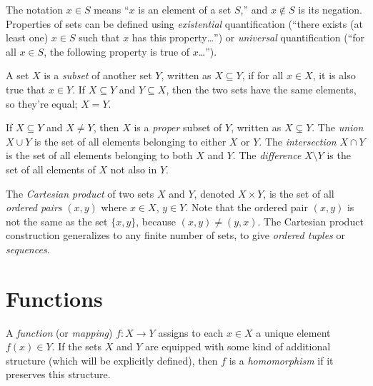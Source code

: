 \documentclass[../generics]{subfiles}
\begin{document}
The notation \index{$\in$}$x\in S$ means ``$x$ is an element of a set $S$,'' and \index{$\notin$}$x\notin S$ is its negation. Properties of sets can be defined using \emph{existential} quantification (``there exists (at least one) $x\in S$ such that $x$ has this property\ldots'') or \emph{universal} quantification (``for all $x\in S$, the following property is true of $x$\ldots'').

%
%
A set $X$ is a \emph{subset} of another set $Y$, written as \index{$\subseteq$}$X\subseteq Y$, if for all $x\in X$, it is also true that $x\in Y$. If $X\subseteq Y$ and $Y\subseteq X$, then the two sets have the same elements, so they're equal; $X=Y$.

If $X\subseteq Y$ and $X\neq Y$, then $X$ is a \emph{proper} subset of $Y$, written as \index{$\subsetneq$}$X\subsetneq Y$. The \emph{union} \index{$\cup$}$X\cup Y$ is the set of all elements belonging to either $X$ or $Y$. The \emph{intersection} \index{$\cap$}$X\cap Y$ is the set of all elements belonging to both $X$ and $Y$. The \emph{difference} \index{$\setminus$}$X\setminus Y$ is the set of all elements of $X$ not also in $Y$.

The \emph{Cartesian product} of two sets $X$ and $Y$, denoted \index{$\times$}$X\times Y$, is the set of all \emph{ordered pairs} $(x,y)$ where $x\in X$, $y\in Y$. Note that the ordered pair $(x,y)$ is not the same as the set $\{x,y\}$, because $(x,y)\neq(y,x)$. The Cartesian product construction generalizes to any finite number of sets, to give \emph{ordered tuples} or \emph{sequences}.

\section*{Functions}

A \emph{function} (or \emph{mapping}) $f\colon X\rightarrow Y$ assigns to each $x\in X$ a unique element $f(x)\in Y$. If the sets $X$ and $Y$ are equipped with some kind of additional structure (which will be explicitly defined), then $f$ is a \emph{homomorphism} if it preserves this structure.
\end{document}
